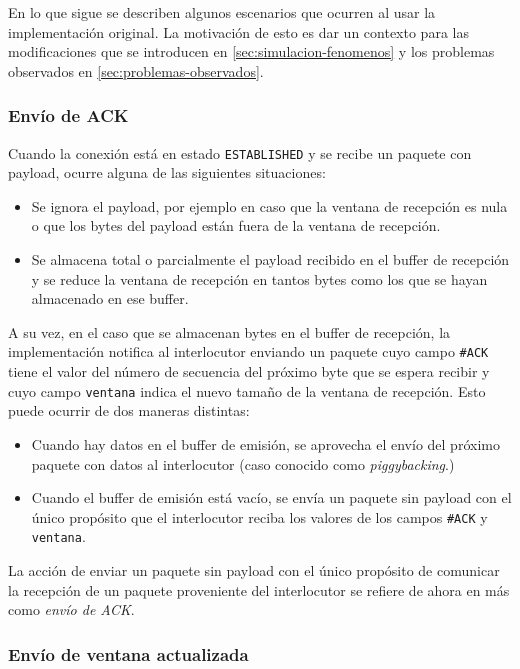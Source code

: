 \documentclass[a4paper, 10pt, twoside]{article}
\newcommand{\established}{\texttt{ESTABLISHED}\xspace}
\newcommand{\ack}{\texttt{\#ACK}\xspace}
\newcommand{\window}{\texttt{ventana}\xspace}
\begin{document}
En lo que sigue se describen algunos escenarios que ocurren al usar la implementación original. La motivación de esto es dar un contexto para las modificaciones que se introducen en \ref{sec:simulacion-fenomenos} y los problemas observados en \ref{sec:problemas-observados}.


\subsubsection{Envío de ACK}

Cuando la conexión está en estado \established y se recibe un paquete con payload, ocurre alguna de las siguientes situaciones:

\begin{itemize}
  \item Se ignora el payload, por ejemplo en caso que la ventana de recepción es nula o que los bytes del payload están fuera de la ventana de recepción.

  \item Se almacena total o parcialmente el payload recibido en el buffer de recepción y se reduce la ventana de recepción en tantos bytes como los que se hayan almacenado en ese buffer.
\end{itemize}

A su vez, en el caso que se almacenan bytes en el buffer de recepción, la implementación notifica al interlocutor enviando un paquete cuyo campo \ack tiene el valor del número de secuencia del próximo byte que se espera recibir y cuyo campo \window indica el nuevo tamaño de la ventana de recepción. Esto puede ocurrir de dos maneras distintas:

\begin{itemize}
  \item Cuando hay datos en el buffer de emisión, se aprovecha el envío del próximo paquete con datos al interlocutor (caso conocido como \emph{piggybacking}.)

  \item Cuando el buffer de emisión está vacío, se envía un paquete sin payload con el único propósito que el interlocutor reciba los valores de los campos \ack y \window.
\end{itemize}

La acción de enviar un paquete sin payload con el único propósito de comunicar la recepción de un paquete proveniente del interlocutor se refiere de ahora en más como \emph{envío de ACK}.


\subsubsection{Envío de ventana actualizada}
\end{document}
